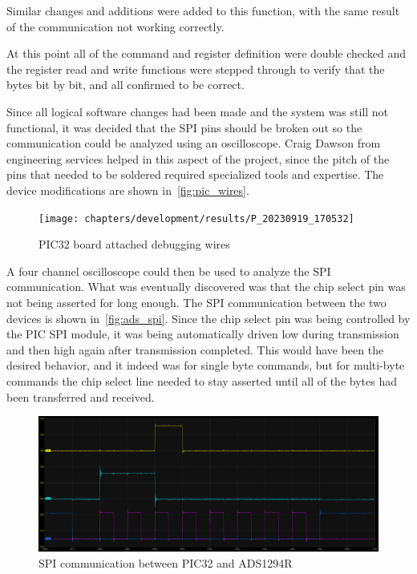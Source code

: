 Similar changes and additions were added to this function, with the same result of the communication not working correctly.

At this point all of the command and register definition were double checked and
the register read and write functions were stepped through to verify that the bytes bit by bit, and all confirmed to be correct.

Since all logical software changes had been made and the system was still not functional,
it was decided that the SPI pins should be broken out so the communication could be analyzed using an oscilloscope.
Craig Dawson from engineering services helped in this aspect of the project,
since the pitch of the pins that needed to be soldered required specialized tools and expertise.
The device modifications are shown in~\autoref{fig:pic_wires}.

\begin{figure}[!ht]
  \caption{PIC32 board attached debugging wires}\label{fig:pic_wires}
  \centering
  \texttt{[image: chapters/development/results/P\_20230919\_170532]}
\end{figure}


A four channel oscilloscope could then be used to analyze the SPI communication.
What was eventually discovered was that the chip select pin was not being asserted for long enough.
The SPI communication between the two devices is shown in~\autoref{fig:ads_spi}.
Since the chip select pin was being controlled by the PIC SPI module,
it was being automatically driven low during transmission and then high again after transmission completed.
This would have been the desired behavior, and it indeed was for single byte commands,
but for multi-byte commands the chip select line needed to stay asserted until all of the bytes had been transferred and received.

\begin{figure}[!ht]
  \caption{SPI communication between PIC32 and ADS1294R}\label{fig:ads_spi}
  \centering
  \includegraphics[width=1\columnwidth]{chapters/development/results/ADS_SPI_COMMS}
\end{figure}

